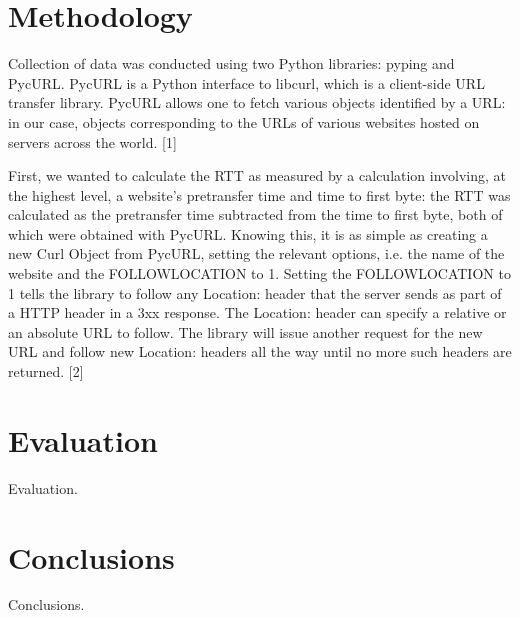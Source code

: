 \documentclass[twocolumn, 10pt, conference]{IEEEtran}
\begin{document}
\section{Methodology}
\label{sec:methodology}


Collection of data was conducted using two Python libraries: pyping and PycURL. PycURL is a Python interface to libcurl, which is a client-side URL transfer library. PycURL allows one to fetch various objects identified by a URL: in our case, objects corresponding to the URLs of various websites hosted on servers across the world. [1]

First, we wanted to calculate the RTT as measured by a calculation involving, at the highest level, a website’s pretransfer time and time to first byte: the RTT was calculated as the pretransfer time subtracted from the time to first byte, both of which were obtained with PycURL. Knowing this, it is as simple as creating a new Curl Object from PycURL, setting the relevant options, i.e. the name of the website and the FOLLOWLOCATION to 1. Setting the FOLLOWLOCATION to 1 tells the library to follow any Location: header that the server sends as part of a HTTP header in a 3xx response. The Location: header can specify a relative or an absolute URL to follow. The library will issue another request for the new URL and follow new Location: headers all the way until no more such headers are returned. [2]


\section{Evaluation}
\label{sec:evaluation}


Evaluation.

\section{Conclusions}
\label{sec:conclusions}



Conclusions.






\end{document}
